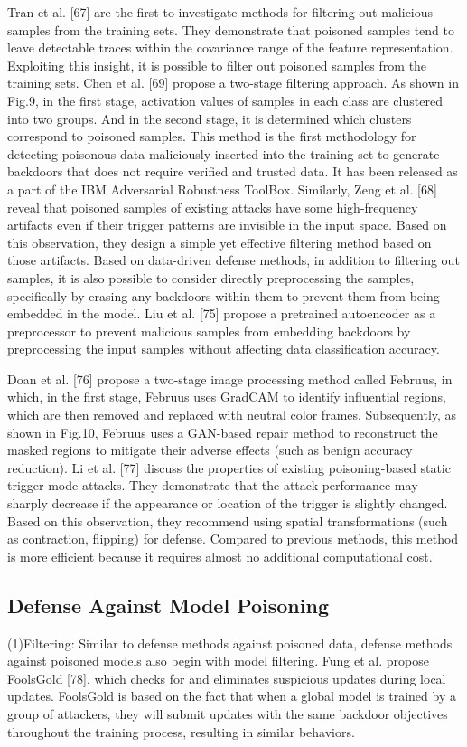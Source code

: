 Tran et al. [67] are the first to investigate methods
for filtering out malicious samples from the training sets.
They demonstrate that poisoned samples tend to leave
detectable traces within the covariance range of the feature
representation. Exploiting this insight, it is possible to
filter out poisoned samples from the training sets. Chen et
al. [69] propose a two-stage filtering approach. As shown
in Fig.9, in the first stage, activation values of samples
in each class are clustered into two groups. And in the
second stage, it is determined which clusters correspond
to poisoned samples. This method is the first methodology
for detecting poisonous data maliciously inserted into the
training set to generate backdoors that does not require
verified and trusted data. It has been released as a part
of the IBM Adversarial Robustness ToolBox. Similarly,
Zeng et al. [68] reveal that poisoned samples of existing
attacks have some high-frequency artifacts even if their
trigger patterns are invisible in the input space. Based on
this observation, they design a simple yet effective filtering
method based on those artifacts. Based on data-driven defense methods, in addition
to filtering out samples, it is also possible to consider
directly preprocessing the samples, specifically by erasing
any backdoors within them to prevent them from being
embedded in the model. Liu et al. [75] propose a 
pretrained autoencoder as a preprocessor to prevent malicious
samples from embedding backdoors by preprocessing the
input samples without affecting data classification accuracy.  

Doan et al. [76] propose a two-stage image processing
method called Februus, in which, in the first stage, Februus
uses GradCAM to identify influential regions, which are
then removed and replaced with neutral color frames.
Subsequently, as shown in Fig.10, Februus uses a GAN-based
repair method to reconstruct the masked regions
to mitigate their adverse effects (such as benign accuracy
reduction). Li et al. [77] discuss the properties of existing
poisoning-based static trigger mode attacks. They 
demonstrate that the attack performance may sharply decrease
if the appearance or location of the trigger is slightly
changed. Based on this observation, they recommend using
spatial transformations (such as contraction, flipping) for
defense. Compared to previous methods, this method is
more eﬀicient because it requires almost no additional
computational cost.  

\subsection{Defense Against Model Poisoning}  
(1)Filtering: Similar to defense methods against
poisoned data, defense methods against poisoned models also
begin with model filtering. Fung et al. propose FoolsGold
[78], which checks for and eliminates suspicious updates
during local updates. FoolsGold is based on the fact that
when a global model is trained by a group of attackers,
they will submit updates with the same backdoor objectives
throughout the training process, resulting in similar behaviors.  

